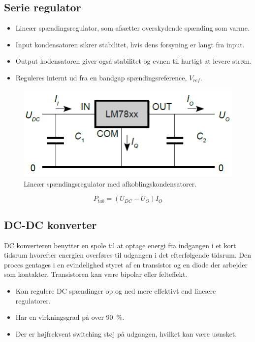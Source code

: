\documentclass[danish]{article}
\begin{document}
\newpage
\subsection{Serie regulator}
\begin{itemize}
	\item Lineær spændingsregulator, som afsætter overskydende spænding som varme.
	\item Input kondensatoren sikrer stabilitet, hvis dens forsyning er langt fra input.
	\item Output kodensatoren giver også stabilitet og evnen til hurtigt at levere strøm.
	\item Reguleres internt ud fra en bandgap spændingsreference, $V_{ref}$.
\end{itemize}

\begin{figure} [H]
	\centering
	\includegraphics[width=0.6\linewidth]{graphics/serieregulator}
	\caption{Lineær spændingsregulator med afkoblingskondensatorer.}
	\label{fig:serieregulator}
\end{figure}

\begin{equation}
P_{tab} = (U_{DC} - U_O) I_O
\end{equation}

\subsection{DC-DC konverter}
DC konverteren benytter en spole til at optage energi fra indgangen i et kort tidsrum hvorefter energien overføres til udgangen i det efterfølgende tidsrum. 
Den proces gentages i en evindelighed styret af en transistor og en diode der arbejder som kontakter. 
Transistoren kan være bipolar eller felteffekt.
\begin{itemize}
	\item Kan regulere DC spændinger op og ned mere effektivt end lineære regulatorer.
	\item Har en virkningsgrad på over \SI{90}{\percent}.
	\item Der er højfrekvent switching støj på udgangen, hvilket kan være uønsket.
\end{itemize}
\end{document}
